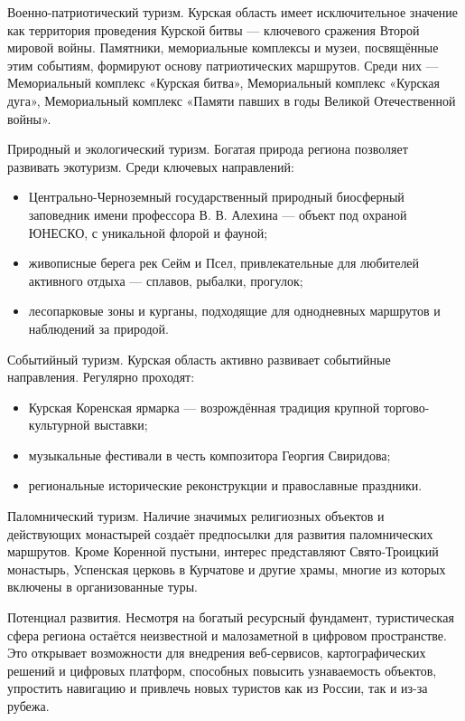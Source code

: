 Военно-патриотический туризм.
Курская область имеет исключительное значение как территория проведения Курской битвы — ключевого сражения Второй мировой войны. Памятники, мемориальные комплексы и музеи, посвящённые этим событиям, формируют основу патриотических маршрутов. Среди них — Мемориальный комплекс «Курская битва», Мемориальный комплекс «Курская дуга», Мемориальный комплекс «Памяти павших в годы Великой Отечественной войны».

Природный и экологический туризм.
Богатая природа региона позволяет развивать экотуризм. Среди ключевых направлений:
\begin{itemize}
	\item Центрально-Черноземный государственный природный биосферный заповедник имени профессора В. В. Алехина — объект под охраной ЮНЕСКО, с уникальной флорой и фауной;
	\item живописные берега рек Сейм и Псел, привлекательные для любителей активного отдыха — сплавов, рыбалки, прогулок;
	\item лесопарковые зоны и курганы, подходящие для однодневных маршрутов и наблюдений за природой.
\end{itemize}

Событийный туризм.
Курская область активно развивает событийные направления. Регулярно проходят:
\begin{itemize}
	\item Курская Коренская ярмарка — возрождённая традиция крупной торгово-культурной выставки;
	\item музыкальные фестивали в честь композитора Георгия Свиридова;
	\item региональные исторические реконструкции и православные праздники.
\end{itemize}

Паломнический туризм.
Наличие значимых религиозных объектов и действующих монастырей создаёт предпосылки для развития паломнических маршрутов. Кроме Коренной пустыни, интерес представляют Свято-Троицкий монастырь, Успенская церковь в Курчатове и другие храмы, многие из которых включены в организованные туры.

Потенциал развития.
Несмотря на богатый ресурсный фундамент, туристическая сфера региона остаётся неизвестной и малозаметной в цифровом пространстве. Это открывает возможности для внедрения веб-сервисов, картографических решений и цифровых платформ, способных повысить узнаваемость объектов, упростить навигацию и привлечь новых туристов как из России, так и из-за рубежа.


